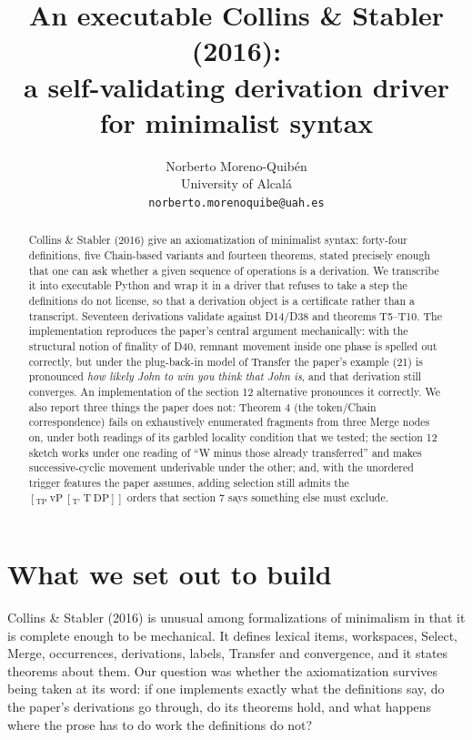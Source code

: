 \documentclass[11pt,a4paper]{article}
\title{An executable Collins \& Stabler (2016):\\
a self-validating derivation driver for minimalist syntax}
\author{Norberto Moreno-Quibén\\
  University of Alcalá\\
  \texttt{norberto.morenoquibe@uah.es}}
\date{}
\newcommand{\pf}[1]{\textit{#1}}
\begin{document}
\maketitle

\begin{abstract}
\noindent
Collins \& Stabler (2016) give an axiomatization of minimalist syntax:
forty-four definitions, five Chain-based variants and fourteen theorems,
stated precisely enough that one can ask whether a given sequence of
operations is a derivation. We transcribe it into executable Python and wrap
it in a driver that refuses to take a step the definitions do not license, so
that a derivation object is a certificate rather than a transcript. Seventeen
derivations validate against D14/D38 and theorems T5--T10. The
implementation reproduces the paper's central argument mechanically: with the
structural notion of finality of D40, remnant movement inside one phase is
spelled out correctly, but under the plug-back-in model of Transfer the
paper's example (21) is pronounced \pf{how likely John to win you think that
John is}, and that derivation still converges. An implementation of the
section 12 alternative pronounces it correctly. We also report three things
the paper does not: Theorem 4 (the token/Chain correspondence) fails on
exhaustively enumerated fragments from three Merge nodes on, under both
readings of its garbled locality condition that we tested; the section 12 sketch works under
one reading of ``W minus those already transferred'' and makes
successive-cyclic movement underivable under the other; and, with the
unordered trigger features the paper assumes, adding selection still admits
the $[_{\mathrm{TP}}\ \mathrm{vP}\ [_{\mathrm{T'}}\ \mathrm{T}\ \mathrm{DP}]]$
orders that section 7 says something else must exclude.
\end{abstract}

\section{What we set out to build}

Collins \& Stabler (2016) is unusual among formalizations of minimalism in
that it is complete enough to be mechanical. It defines lexical items,
workspaces, Select, Merge, occurrences, derivations, labels, Transfer and
convergence, and it states theorems about them. Our question was whether the
axiomatization survives being taken at its word: if one implements exactly
what the definitions say, do the paper's derivations go through, do its
theorems hold, and what happens where the prose has to do work the
definitions do not?
\end{document}
